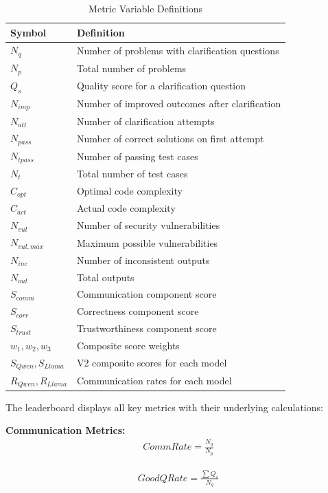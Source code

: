 \documentclass[conference]{IEEEtran}
\begin{document}
\begin{table}[ht]
\centering
\caption{Metric Variable Definitions}
\begin{tabular}{ll}
\toprule
\textbf{Symbol} & \textbf{Definition} \\
\midrule
$N_{q}$ & Number of problems with clarification questions \\
$N_{p}$ & Total number of problems \\
$Q_{s}$ & Quality score for a clarification question \\
$N_{imp}$ & Number of improved outcomes after clarification \\
$N_{att}$ & Number of clarification attempts \\
$N_{pass}$ & Number of correct solutions on first attempt \\
$N_{tpass}$ & Number of passing test cases \\
$N_{t}$ & Total number of test cases \\
$C_{opt}$ & Optimal code complexity \\
$C_{act}$ & Actual code complexity \\
$N_{vul}$ & Number of security vulnerabilities \\
$N_{vul,max}$ & Maximum possible vulnerabilities \\
$N_{inc}$ & Number of inconsistent outputs \\
$N_{out}$ & Total outputs \\
$S_{comm}$ & Communication component score \\
$S_{corr}$ & Correctness component score \\
$S_{trust}$ & Trustworthiness component score \\
$w_1, w_2, w_3$ & Composite score weights \\
$S_{Qwen}, S_{Llama}$ & V2 composite scores for each model \\
$R_{Qwen}, R_{Llama}$ & Communication rates for each model \\
\bottomrule
\end{tabular}
\label{tab:variables}
\end{table}

The leaderboard displays all key metrics with their underlying calculations:

\textbf{Communication Metrics:}
\begin{align}
    \mathit{CommRate} = \frac{N_{q}}{N_{p}}
\end{align}

\begin{align}
    \mathit{GoodQRate} = \frac{\sum Q_{s}}{N_{q}}
\end{align}
\end{document}
